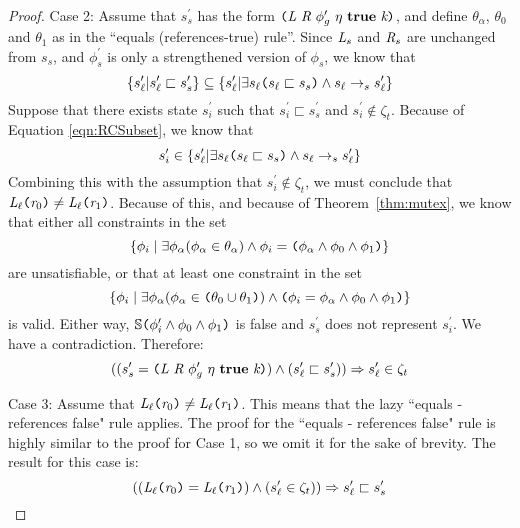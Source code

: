 \begin{proof}
Case 2:  Assume that $s_s^\prime$ has the form $\lp \cfgnt{L}\ \cfgnt{R}\ \phi_g^\prime\ \eta\ \cfgt{true}\ \cfgnt{k}\rp $, and define $\theta_\alpha$, $\theta_0$ and $\theta_1$ as in the ``equals (references-true) rule''. Since $\emph{L}_s$ and $\emph{R}_s$ are unchanged from $s_s$, and $\phi_s^\prime$ is only a strengthened version of $\phi_s$,  we know that
\begin{equation}
\label{eqn:RCSubset}
\{s_\ell^\prime | s_\ell^\prime \sqsubset s_s^\prime \} \subseteq \{s_\ell^\prime | \exists s_\ell \texttt{(} s_\ell \sqsubset s_s \texttt{)} \wedge s_\ell \rightarrow_s s_\ell^\prime\}
\end{equation}
Suppose that there exists state $s_i^\prime$ such that $s_i^\prime \sqsubset s_s^\prime$ and $s_i^\prime \notin \zeta_t$. Because of Equation \ref{eqn:RCSubset}, we know that 
$$s_i^\prime \in \{s_\ell^\prime | \exists s_\ell \texttt{(} s_\ell \sqsubset s_s\texttt{)} \wedge s_\ell \rightarrow_s s_\ell^\prime\}$$ 
Combining this with the assumption that $s_i^\prime \notin \zeta_t$, we must conclude that $\emph{L}_\ell \texttt{(} \emph{r}_0\texttt{)} \neq  \emph{L}_\ell \texttt{(} \emph{r}_1 \texttt{)}$. Because of this, and because of Theorem~\ref{thm:mutex}, we know that either all constraints in the set
$$\{\phi_i \mid \exists \phi_\alpha (\phi_\alpha \in \theta_\alpha)\wedge \phi_i = \texttt{(}\phi_\alpha \wedge \phi_0 \wedge \phi_1\texttt{)}\}$$ are unsatisfiable, or that at least one constraint in the set
$$\{\phi_i \mid \exists \phi_\alpha (\phi_\alpha \in \texttt{(} \theta_0 \cup \theta_1 \texttt{)})\wedge \texttt{(} \phi_i = \phi_\alpha \wedge \phi_0 \wedge \phi_1 \texttt{)}\}$$ 
is valid. Either way, $\mathbb{S}\texttt{(}\phi_i^\prime \wedge\phi_0\wedge \phi_1\texttt{)}$ is false and $s_s^\prime$ does not represent $s_i^\prime$. We have a contradiction. Therefore: 
\begin{equation}
\label{eqn:RCBackwardsTrue}
((s_s^\prime=\lp \cfgnt{L}\ \cfgnt{R}\ \phi_g^\prime\ \eta\ \cfgt{true}\ \cfgnt{k}\rp) \wedge (s_\ell^\prime \sqsubset s_s^\prime)) \Rightarrow s_\ell^\prime \in \zeta_t
\end{equation}

Case 3: Assume that $\emph{L}_\ell \texttt{(} \emph{r}_0\texttt{)} \neq \emph{L}_\ell \texttt{(} \emph{r}_1 \texttt{)}$.
This means that the lazy ``equals - references false" rule applies. The proof for the ``equals - references false" rule is highly similar to the proof for Case 1, so we omit it for the sake of brevity. The result for this case is:
\begin{equation}
\label{eqn:RCForwardsFalse}
((\emph{L}_\ell \texttt{(} \emph{r}_0\texttt{)} = \emph{L}_\ell \texttt{(} \emph{r}_1 \texttt{)}) \wedge (s_\ell^\prime \in \zeta_t)) \Rightarrow s_\ell^\prime \sqsubset s_s^\prime
\end{equation}


\end{proof}
